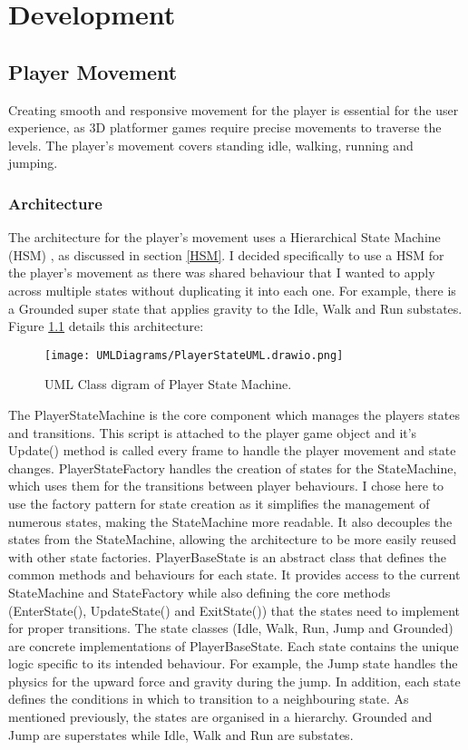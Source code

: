 \documentclass[10pt]{final_report}
\begin{document}
\chapter{Development}
\section{Player Movement}
Creating smooth and responsive movement for the player is essential for the user experience, as 3D platformer games require precise movements to traverse the levels. The player's movement covers standing idle, walking, running and jumping. 
\subsection{Architecture}
The architecture for the player's movement uses a Hierarchical State Machine (HSM) , as discussed in section \ref{HSM}.  I decided specifically to use a HSM for the player's movement as there was shared behaviour that I wanted to apply across multiple states without duplicating it into each one. For example, there is a Grounded super state that applies gravity to the Idle, Walk and Run substates. Figure \ref{fig:label_State} details this architecture:

\begin{figure}[h!]
    \centering
    \texttt{[image: UMLDiagrams/PlayerStateUML.drawio.png]}
    \caption{UML Class digram of Player State Machine.}
    \label{fig:label_State}
\end{figure}

The PlayerStateMachine is the core component which manages the players states and transitions. This script is attached to the player game object and it's Update() method is called every frame to handle the player movement and state changes. PlayerStateFactory handles the creation of states for the StateMachine, which uses them for the transitions between player behaviours. I chose here to use the factory pattern for state creation as it simplifies the management of numerous states, making the StateMachine more readable. It also decouples the states from the StateMachine, allowing the architecture to be more easily reused with other state factories. PlayerBaseState is an abstract class that defines the common methods and behaviours for each state.  It provides access to the current StateMachine and StateFactory while also defining the core methods (EnterState(), UpdateState() and ExitState()) that the states need to implement for proper transitions. The state classes (Idle, Walk, Run, Jump and Grounded) are concrete implementations of PlayerBaseState. Each state contains the unique logic specific to its intended behaviour. For example, the Jump state handles the physics for the upward force and gravity during the jump. In addition, each state defines the conditions in which to transition to a neighbouring state. As mentioned previously, the states are organised in a hierarchy. Grounded and Jump are superstates while Idle, Walk and Run are substates. 
\end{document}
